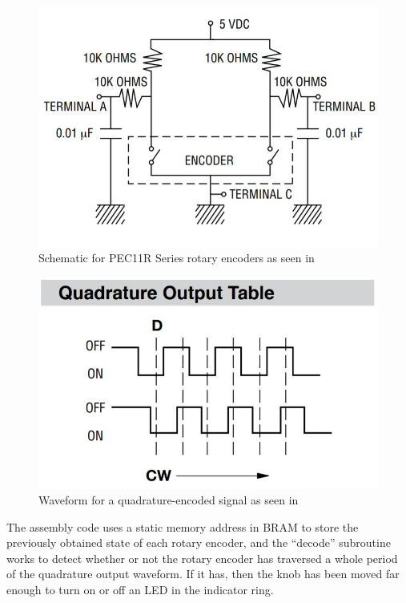 \documentclass[conference]{IEEEtran}
\begin{document}
\begin{figure}[h]
    \centering
    \includegraphics[scale=0.4]{./resources/figures/rotary_encoder_schematic.jpg}
    \caption{Schematic for PEC11R Series rotary encoders as seen in \cite{cite:rotary_encoders}}
    \label{fig:rotary_encoder_schematic}
\end{figure}

\begin{figure}[h]
    \centering
    \includegraphics[scale=0.4]{./resources/figures/quadrature_output_table.jpg}
    \caption{Waveform for a quadrature-encoded signal as seen in \cite{cite:rotary_encoders}}
    \label{fig:quadrature_encoding}
\end{figure}

The assembly code uses a static memory address in BRAM to store the previously obtained state of each rotary encoder, and the ``decode'' subroutine works to detect whether or not the rotary encoder has traversed a whole period of the quadrature output waveform. If it has, then the knob has been moved far enough to turn on or off an LED in the indicator ring.
\end{document}
